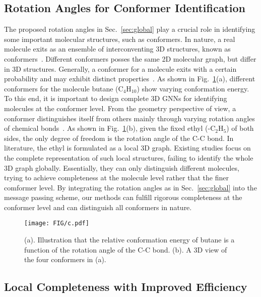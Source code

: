 \documentclass{article}
\begin{document}
\subsection{Rotation Angles for Conformer Identification}  \label{sec:glob_conformer}
The proposed rotation angles 
in Sec.~\ref{sec:global} play a crucial role
in identifying some important molecular structures, such as conformers.
In nature, a real molecule exits as an ensemble of interconventing 3D structures,
known as conformers~\citep{axelrod2022geom,axelrod2020molecular,ganea2021geomol}.
Different conformers posses the same 2D molecular graph, but differ in 3D structures.
Generally, a conformer for a molecule exits with a certain probability and may exhibit 
distinct properties~\citep{axelrod2022geom,axelrod2020molecular}.
As shown in Fig.~\ref{fig:conformer}(a),
different conformers for the molecule butane ($\text{C}_4\text{H}_{10}$)
show varying conformation energy.
To this end, it is important to design complete 3D GNNs for 
identifying molecules at the conformer level.
From the geometry perspective of view,
a conformer distinguishes itself from others mainly
through varying rotation angles of chemical bonds~\citep{ganea2021geomol}.
As shown in Fig.~\ref{fig:conformer}(b), 
given the fixed ethyl (-$\text{C}_2\text{H}_{5}$) of both sides, 
the only degree of freedom is the rotation angle of the C-C bond.
In literature, the ethyl is formulated as a local 3D graph. 
Existing studies focus on the complete representation of 
such local structures, failing to identify the whole 3D graph globally.
Essentially, they can only distinguish different molecules, trying to achieve
completeness at the molecule level rather that the finer comformer level.
By integrating the rotation angles as in Sec.~\ref{sec:global} into the message passing scheme,
our methods can fulfill rigorous completeness at the conformer level and can distinguish all conformers in nature.

\begin{figure}[t]
    \centering
    \texttt{[image: FIG/c.pdf]}
    \vspace{-8 pt}
    \caption{(a). Illustration that the relative conformation energy of butane is a function of the rotation angle of the C-C bond.
    (b). A 3D view of the four conformers in (a).
    }\label{fig:conformer}
    \vspace{-15 pt}
\end{figure}


\subsection{Local Completeness with Improved Efficiency} \label{sec:local}
\end{document}
